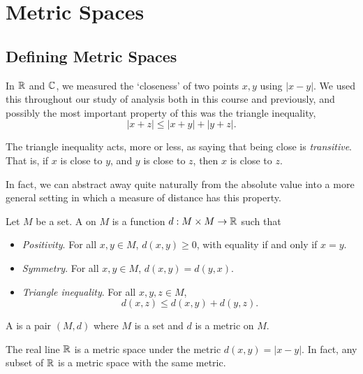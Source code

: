 \documentclass[a4paper]{scrartcl}
\begin{document}
\section{Metric Spaces}

\subsection{Defining Metric Spaces}

In $\mathbb{R}$ and $\mathbb{C}$, we measured the `closeness' of two points $x, y$ using $|x - y|$. We used this throughout our study of analysis both in this course and previously, and possibly the most important property of this was the triangle inequality,
$$
|x + z| \leq |x + y| + |y + z|.
$$

The triangle inequality acts, more or less, as saying that being close is \emph{transitive}. That is, if $x$ is close to $y$, and $y$ is close to $z$, then $x$ is close to $z$.

In fact, we can abstract away quite naturally from the absolute value into a more general setting in which a measure of distance has this property.

\begin{definition}[Metric]
    Let $M$ be a set. A  on $M$ is a function $d: M \times M \rightarrow \mathbb{R}$ such that
    \begin{itemize}
        \item \emph{Positivity}. For all $x, y \in M$, $d(x, y) \geq 0$, with equality if and only if $x = y$.
        \item \emph{Symmetry}. For all $x, y \in M$, $d(x, y) = d(y, x)$.
        \item \emph{Triangle inequality}. For all $x, y, z \in M$,
        $$
        d(x, z) \leq d(x, y) + d(y, z).
        $$
    \end{itemize}
\end{definition}

\begin{definition}
    A  is a pair $(M, d)$ where $M$ is a set and $d$ is a metric on $M$. 
\end{definition}

\begin{example}
    The real line $\mathbb{R}$ is a metric space under the metric $d(x, y) = |x - y|$. In fact, any subset of $\mathbb{R}$ is a metric space with the same metric.
\end{example}
\end{document}

